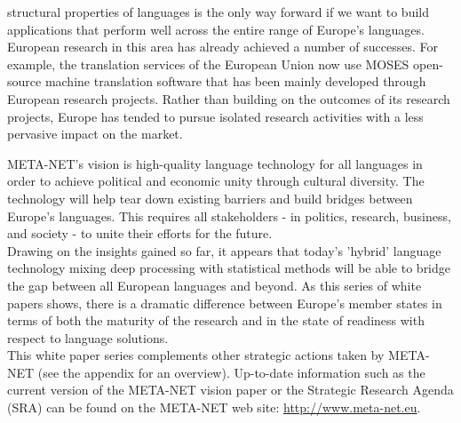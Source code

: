 \begin{multicols}{2}
structural properties of languages is the only way forward if we want to build
applications that perform well across the entire range of Europe’s languages.\\
European research in this area has already achieved a number of successes. For
example, the translation services of the European Union now use MOSES
open-source machine translation software that has been mainly developed through
European research projects. Rather than building on the outcomes of its
research projects, Europe has tended to pursue isolated research activities
with a less pervasive impact on the market. 


META-NET’s vision is high-quality language
technology for all languages in order to achieve political and
economic unity through cultural diversity. The technology will help
tear down existing barriers and build bridges between Europe’s
languages. This requires all stakeholders - in politics, research,
business, and society - to unite their efforts for the future.\\
Drawing on the insights gained so far, it appears that today’s
'hybrid' language technology mixing deep processing with statistical
methods will be able to bridge the gap between all European languages
and beyond. As this series of white papers shows, there is a dramatic
difference between Europe’s member states in terms of both the maturity of the research and in the state of readiness with respect to language solutions.\\
This white paper series complements other strategic actions taken by
META-NET (see the appendix for an overview). Up-to-date information
such as the current version of the META-NET vision paper \cite{Vision}
or the Strategic Research Agenda (SRA) can be found on the META-NET
web site: \url{http://www.meta-net.eu}.

\end{multicols}
\clearpage
{}
